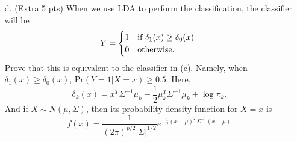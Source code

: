 \documentclass[11pt,letter]{exam}
\begin{document}
\begin{questions}
\begin{enumerate}
\item[d.] (Extra 5 pts) When we use LDA to perform the classification, the classifier will be  
\begin{equation}  \notag
  Y =
    \begin{cases}
      1 & \text{if $\delta_1(x) \geq \delta_0(x)$ }\\
      0 & \text{otherwise}.
    \end{cases}     
\end{equation}
Prove that this is equivalent to the classifier in (c). Namely, when $\delta_1(x) \geq \delta_0(x)$, Pr$(Y = 1 | X = x) \geq 0.5$. Here, 
\[  
	\delta_k(x) = x^T \Sigma^{-1}\mu_k - \frac{1}{2} \mu_k^T \Sigma^{-1} \mu_k + \log \pi_k.
\] And if $X \sim N(\mu, \Sigma)$, then its probability density function for $X = x$ is 
\[
	f(x) = \frac{1}{(2\pi)^{p/2} |\Sigma|^{1/2}} e^{-\frac{1}{2}(x - \mu)^T \Sigma^{-1}(x - \mu) }
\]
\end{enumerate}
\newpage


\end{questions}
\end{document}
